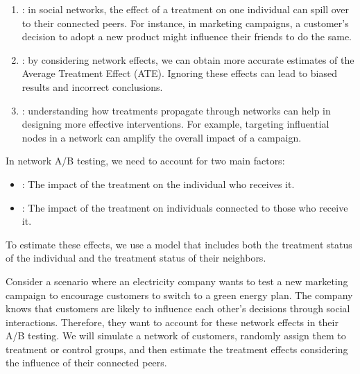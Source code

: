 \documentclass[letterpaper,10pt,english]{jupyterBook}
\begin{document}
\sphinxAtStartPar
{}
\begin{enumerate}
%
\item {} 
\sphinxAtStartPar
{}: in social networks, the effect of a treatment on one individual can spill over to their connected peers. For instance, in marketing campaigns, a customer’s decision to adopt a new product might influence their friends to do the same.

\item {} 
\sphinxAtStartPar
{}: by considering network effects, we can obtain more accurate estimates of the Average Treatment Effect (ATE). Ignoring these effects can lead to biased results and incorrect conclusions.

\item {} 
\sphinxAtStartPar
{}: understanding how treatments propagate through networks can help in designing more effective interventions. For example, targeting influential nodes in a network can amplify the overall impact of a campaign.

\end{enumerate}

\sphinxAtStartPar
In network A/B testing, we need to account for two main factors:
\begin{itemize}
\item {} 
\sphinxAtStartPar
{}: The impact of the treatment on the individual who receives it.

\item {} 
\sphinxAtStartPar
{}: The impact of the treatment on individuals connected to those who receive it.

\end{itemize}

\sphinxAtStartPar
To estimate these effects, we use a model that includes both the treatment status of the individual and the treatment status of their neighbors.

\sphinxAtStartPar
Consider a scenario where an electricity company wants to test a new marketing campaign to encourage customers to switch to a green energy plan. The company knows that customers are likely to influence each other’s decisions through social interactions. Therefore, they want to account for these network effects in their A/B testing. We will simulate a network of customers, randomly assign them to treatment or control groups, and then estimate the treatment effects considering the influence of their connected peers.
\end{document}
